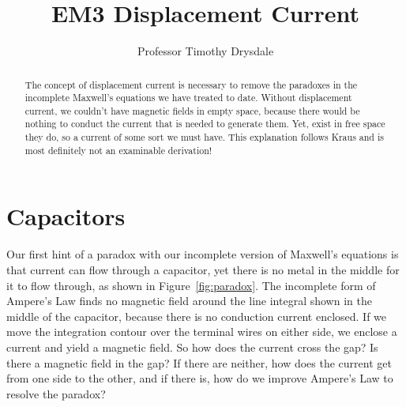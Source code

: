 \documentclass{tufte-handout}
\title{EM3 Displacement Current}
\author{Professor Timothy Drysdale}
\begin{document}
\maketitle

\begin{abstract}
\noindent
The concept of displacement current is necessary to remove the paradoxes in the incomplete Maxwell's equations we have treated to date. Without displacement current, we couldn't have magnetic fields in empty space, because there would be nothing to conduct the current that is needed to generate them. Yet, exist in free space they do, so a current of some sort we must have. This explanation follows Kraus and is most definitely not an examinable derivation!
\end{abstract}

\section{Capacitors}
Our first hint of a paradox with our incomplete version of Maxwell's equations is that current can flow through a capacitor, yet there is no metal in the middle for it to flow through, as shown in Figure~\ref{fig:paradox}. The incomplete form of Ampere's Law finds no magnetic field around the line integral shown in the middle of the capacitor, because there is no conduction current enclosed. If we move the integration contour over the terminal wires on either side, we enclose a current and yield a magnetic field. So how does the current cross the gap? Is there a magnetic field in the gap? If there are neither, how does the current get from one side to the other, and if there is, how do we improve Ampere's Law to resolve the paradox?
\end{document}

